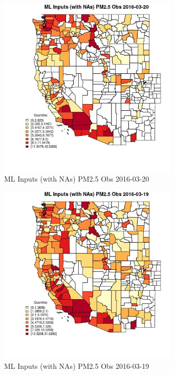 
\clearpage 

\begin{figure} 
\centering  
\includegraphics[width=0.77\textwidth]{Code_Outputs/Report_ML_input_PM25_Step4_part_e_de_duplicated_aveswNAs_CountyPM25_ObsMean2016-03-20_2016-03-20.jpg} 
\caption{\label{fig:Report_ML_input_PM25_Step4_part_e_de_duplicated_aveswNAsCountyPM25_ObsMean2016-03-20_2016-03-20}ML Inputs (with NAs) PM2.5 Obs 2016-03-20} 
\end{figure} 
 

\begin{figure} 
\centering  
\includegraphics[width=0.77\textwidth]{Code_Outputs/Report_ML_input_PM25_Step4_part_e_de_duplicated_aveswNAs_CountyPM25_ObsMean2016-03-19_2016-03-19.jpg} 
\caption{\label{fig:Report_ML_input_PM25_Step4_part_e_de_duplicated_aveswNAsCountyPM25_ObsMean2016-03-19_2016-03-19}ML Inputs (with NAs) PM2.5 Obs 2016-03-19} 
\end{figure} 
 

